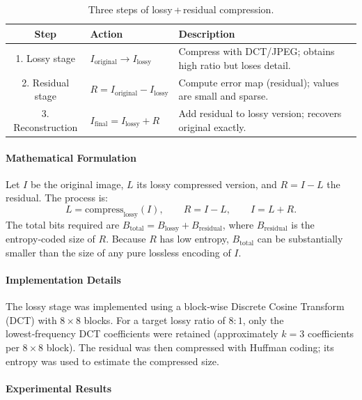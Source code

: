\begin{table}[H]
\centering
\caption{Three steps of lossy + residual compression.}
\label{tab:lossy_residual_steps}
\begin{tabular}{|c|p{3cm}|p{6cm}|}
\hline
\textbf{Step} & \textbf{Action} & \textbf{Description} \\
\hline
1. Lossy stage & \(I_{\text{original}} \to I_{\text{lossy}}\) & Compress with DCT/JPEG; obtains high ratio but loses detail. \\
\hline
2. Residual stage & \(R = I_{\text{original}} - I_{\text{lossy}}\) & Compute error map (residual); values are small and sparse. \\
\hline
3. Reconstruction & \(I_{\text{final}} = I_{\text{lossy}} + R\) & Add residual to lossy version; recovers original exactly. \\
\hline
\end{tabular}
\end{table}

\paragraph{Mathematical Formulation}
Let \(I\) be the original image, \(L\) its lossy compressed version, and \(R = I - L\) the residual. The process is\cite{Salomon1997}:
\[
L = \text{compress}_{\text{lossy}}(I),\qquad R = I - L,\qquad I = L + R. 
\]
The total bits required are \(B_{\text{total}} = B_{\text{lossy}} + B_{\text{residual}}\), where \(B_{\text{residual}}\) is the entropy‑coded size of \(R\). Because \(R\) has low entropy, \(B_{\text{total}}\) can be substantially smaller than the size of any pure lossless encoding of \(I\).

\paragraph{Implementation Details}
The lossy stage was implemented using a block‑wise Discrete Cosine Transform (DCT) with \(8\times8\) blocks. For a target lossy ratio of \(8:1\), only the lowest‑frequency DCT coefficients were retained (approximately \(k = 3\) coefficients per \(8\times8\) block). The residual was then compressed with Huffman coding; its entropy was used to estimate the compressed size.

\paragraph{Experimental Results}

